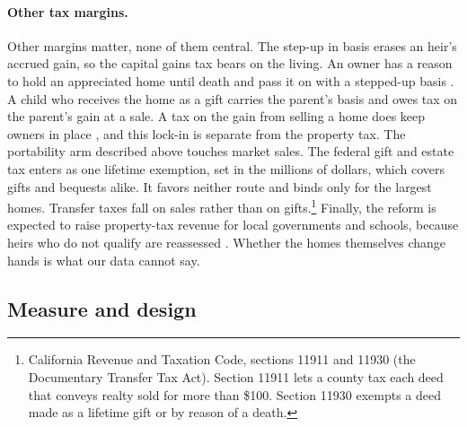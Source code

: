 \paragraph{Other tax margins.}
Other margins matter, none of them central. The step-up in basis erases an heir's accrued gain, so the capital gains tax bears on the living. An owner has a reason to hold an appreciated home until death and pass it on with a stepped-up basis \citep{autenjoulfaian2001bequest}. A child who receives the home as a gift carries the parent's basis and owes tax on the parent's gain at a sale. A tax on the gain from selling a home does keep owners in place \citep{shan2011capital}, and this lock-in is separate from the property tax.
The portability arm described above touches market sales. The federal gift and estate tax enters as one lifetime exemption, set in the millions of dollars, which covers gifts and bequests alike. It favors neither route and binds only for the largest homes. Transfer taxes fall on sales rather than on gifts.\footnote{California Revenue and Taxation Code, sections 11911 and 11930 (the Documentary Transfer Tax Act). Section 11911 lets a county tax each deed that conveys realty sold for more than \$100. Section 11930 exempts a deed made as a lifetime gift or by reason of a death.}
Finally, the reform is expected to raise property-tax revenue for local governments and schools, because heirs who do not qualify are reassessed \citep{lao2020prop19}. Whether the homes themselves change hands is what our data cannot say.

\subsection{Measure and design}\label{subsec:design}

